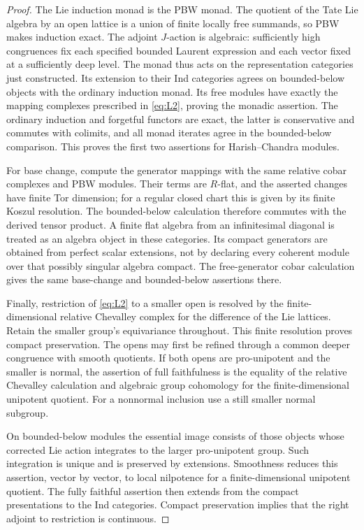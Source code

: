 \documentclass[11pt]{article}
\numberwithin{equation}{section}
\theoremstyle{definition}
\theoremstyle{remark}
\begin{document}
\begin{proof}
The Lie induction monad is the PBW monad.  The quotient of the Tate
Lie algebra by an open lattice is a union of finite locally free
summands, so PBW makes induction exact.  The adjoint $J$-action is
algebraic: sufficiently high congruences fix each specified bounded
Laurent expression and each vector fixed at a sufficiently deep
level.  The monad thus acts on the representation categories just
constructed.  Its extension to their Ind categories agrees on
bounded-below objects with the ordinary induction monad.  Its free
modules have exactly the mapping complexes prescribed in
\eqref{eq:L2}, proving the monadic assertion.  The ordinary induction
and forgetful functors are exact, the latter is conservative and
commutes with colimits, and all monad iterates agree in the
bounded-below comparison.  This proves the first two assertions for
Harish--Chandra modules.

For base change, compute the generator mappings with the same relative
cobar complexes and PBW modules.  Their terms are $R$-flat, and the
asserted changes have finite Tor dimension; for a regular closed
chart this is given by its finite Koszul resolution.
The bounded-below calculation therefore commutes with the derived
tensor product.  A finite flat algebra from an infinitesimal diagonal
is treated as an algebra object in these categories.  Its compact
generators are obtained from perfect scalar extensions, not by
declaring every coherent module over that possibly singular algebra
compact.  The free-generator cobar calculation gives the same
base-change and bounded-below assertions there.

Finally, restriction of \eqref{eq:L2} to a smaller open is resolved
by the finite-dimensional relative Chevalley complex for the
difference of the Lie lattices.  Retain the smaller group's
equivariance throughout.  This finite resolution proves compact
preservation.  The opens may first be refined through a common
deeper congruence with smooth quotients.  If both opens are
pro-unipotent and the smaller is normal, the assertion of full
faithfulness is the equality of the relative Chevalley calculation
and algebraic group cohomology for the finite-dimensional unipotent
quotient.  For a nonnormal inclusion use a still smaller normal
subgroup.

On bounded-below modules the essential image consists of those
objects whose corrected Lie action integrates to the larger
pro-unipotent group.  Such integration is unique and is preserved by
extensions.  Smoothness reduces this assertion, vector by vector,
to local nilpotence for a finite-dimensional unipotent quotient.
The fully faithful assertion then extends from the compact
presentations to the Ind categories.  Compact preservation implies
that the right adjoint to restriction is continuous.
\end{proof}
\end{document}
